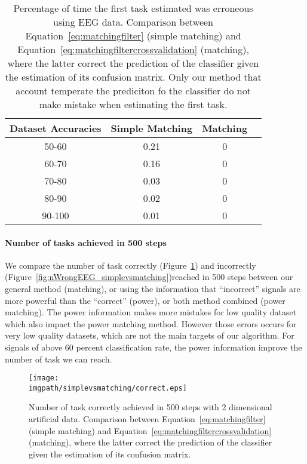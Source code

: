 \begin{table}
\centering
{}
\begin{tabular}{c c c c}
    Dataset Accuracies & Simple Matching &  Matching \\ \hline
    50-60 & 0.21 & 0 \\ 
    60-70 & 0.16 & 0 \\
    70-80 & 0.03 & 0 \\
    80-90 & 0.02 & 0 \\
    90-100 & 0.01 & 0 \\
\end{tabular}
\caption{Percentage of time the first task estimated was erroneous using EEG data. Comparison between Equation~\ref{eq:matchingfilter} (simple matching) and Equation~\ref{eq:matchingfiltercrossvalidation} (matching), where the latter correct the prediction of the classifier given the estimation of its confusion matrix. Only our method that account temperate the prediciton fo the classifier do not make mistake when estimating the first task.}
\label{tab:errorTaskRatiosimplevsmatching}
\end{table}

\paragraph{Number of tasks achieved in 500 steps}

We compare the number of task correctly (Figure~\ref{fig:nCorrect_simplevsmatching}) and incorrectly (Figure~\ref{fig:nWrongEEG_simplevsmatching})reached in 500 steps between our general method (matching), or using the information that ``incorrect'' signals are more powerful than the ``correct'' (power), or both method combined (power matching). The power information makes more mistakes for low quality dataset which also impact the power matching method. However those errors occurs for very low quality datasets, which are not the main targets of our algorithm. For signals of above 60 percent classification rate, the power information improve the number of task we can reach. 

\begin{figure}[!ht]
\centering
\texttt{[image: \\imgpath/simplevsmatching/correct.eps]}
\caption{Number of task correctly achieved in 500 steps with 2 dimensional artificial data. Comparison between Equation~\ref{eq:matchingfilter} (simple matching) and Equation~\ref{eq:matchingfiltercrossvalidation} (matching), where the latter correct the prediction of the classifier given the estimation of its confusion matrix. 
}
\label{fig:nCorrect_simplevsmatching}
\end{figure} 

